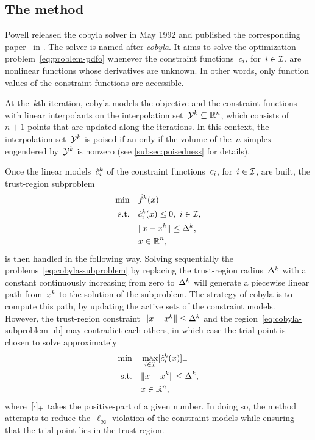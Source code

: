 \subsection{The  method}
\label{subsec:cobyla}

Powell released the \gls{cobyla} solver in May 1992 and published the corresponding paper~\cite{Powell_1994} in .
The solver is named after \emph{\glsdesc{cobyla}}.
It aims to solve the optimization problem~\cref{eq:problem-pdfo} whenever the constraint functions~$c_{i}$, for~$i \in \mathcal{I}$, are nonlinear functions whose derivatives are unknown.
In other words, only function values of the constraint functions are accessible.

At the~$k$th iteration, \gls{cobyla} models the objective and the constraint functions with linear interpolants on the interpolation set~$\xpt[k] \subseteq \R^n$, which consists of~$n + 1$ points that are updated along the iterations.
In this context, the interpolation set~$\xpt[k]$ is poised if an only if the volume of the~$n$-simplex engendered by~$\xpt[k]$ is nonzero (see \cref{subsec:poisedness} for details).

Once the linear models~$\conm[k]{i}$ of the constraint functions~$c_{i}$, for~$i \in \mathcal{I}$, are built, the trust-region subproblem
\begin{subequations}
    \label{eq:cobyla-subproblem}
    \begin{align}
        \min        & \quad \objm[k](\iter)\\
        \text{s.t.} & \quad \conm[k]{i}(\iter) \le 0, ~ i \in \iub, \label{eq:cobyla-subproblem-ub}\\
                    & \quad \norm{\iter - \iter[k]} \le \rad[k],\\
                    & \quad \iter \in \R^n, \nonumber
    \end{align}
\end{subequations}
is then handled in the following way.
Solving sequentially the problems~\cref{eq:cobyla-subproblem} by replacing the trust-region radius~$\rad[k]$ with a constant continuously increasing from zero to~$\rad[k]$ will generate a piecewise linear path from~$\iter[k]$ to the solution of the subproblem.
The strategy of \gls{cobyla} is to compute this path, by updating the active sets of the constraint models.
However, the trust-region constraint~$\norm{\iter - \iter[k]} \le \rad[k]$ and the region~\cref{eq:cobyla-subproblem-ub} may contradict each others, in which case the trial point is chosen to solve approximately
\begin{align*}
    \min        & \quad \max_{i \in \iub} \posp{\conm[k]{i}(\iter)}\\
    \text{s.t.} & \quad \norm{\iter - \iter[k]} \le \rad[k],\\
                & \quad \iter \in \R^n,
\end{align*}
where~$[\cdot]_+$ takes the positive-part of a given number.
In doing so, the method attempts to reduce the~$\ell_{\infty}$-violation of the constraint models while ensuring that the trial point lies in the trust region.

